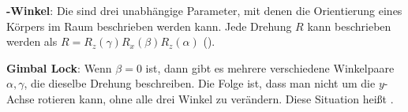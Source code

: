 \textbf{-Winkel}:
Die  sind drei unabhängige Parameter, mit denen die Orientierung
eines Körpers im Raum beschrieben werden kann.
Jede Drehung $R$ kann beschrieben werden als $R = R_z(\gamma) R_x(\beta) R_z(\alpha)$
().

\textbf{Gimbal Lock}:
Wenn $\beta = 0$ ist, dann gibt es mehrere verschiedene Winkelpaare $\alpha, \gamma$, die dieselbe
Drehung beschreiben.
Die Folge ist, dass man nicht um die $y$-Achse rotieren kann, ohne alle drei Winkel zu verändern.
Diese Situation heißt .

\pagebreak
